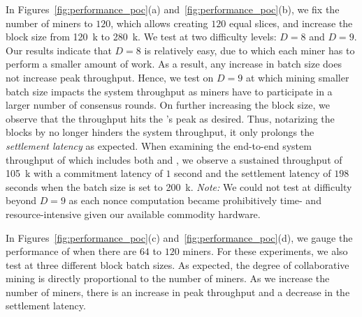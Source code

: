 In Figures~\ref{fig:performance_poc}(a) and~\ref{fig:performance_poc}(b), 
we fix the number of miners to $120$, which allows creating $120$ equal slices, and 
increase the block size from \SI{120}{k} to \SI{280}{k}. We test at two 
difficulty levels: $D=8$ and $D=9$. Our results indicate that $D=8$ is 
relatively easy, due to which each miner has to perform a smaller amount 
of work. As a result, any increase in batch size does not increase peak 
throughput. Hence, we test on $D=9$ at which mining smaller batch size 
impacts the system throughput as miners have to participate in a larger 
number of consensus rounds. On further increasing the block size, 
we observe that the throughput hits the \PBFT{}'s peak as desired. Thus, 
notarizing the blocks by \PoC{} no longer hinders the system throughput, 
it only prolongs the \textit{settlement latency} as expected. 
%
When examining the end-to-end system throughput of \DualChain{} which 
includes both \PBFT{} and \PoC{}, we observe a sustained throughput 
of \SI{105}{k} with a commitment latency of $1$ second and the settlement 
latency of $198$ seconds when the batch size is set to \SI{200}{k}. 
{\em Note:} We could not test at difficulty beyond $D=9$ as each nonce 
computation became prohibitively time- and resource-intensive given 
our available commodity hardware.

In Figures~\ref{fig:performance_poc}(c) and~\ref{fig:performance_poc}(d), 
we gauge the performance of \PoC{} when there are $64$ to $120$ miners. 
For these experiments, we also test at three different block batch sizes. 
As expected, the degree of collaborative mining is directly proportional 
to the number of miners. As we increase the number of miners, there is an
increase in peak throughput and a decrease in the settlement latency.


%
 

